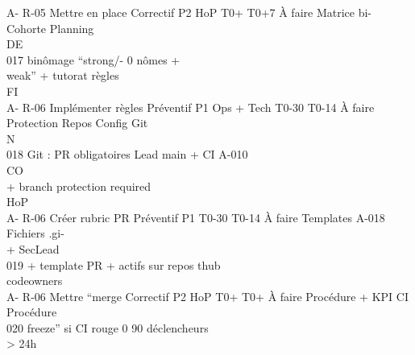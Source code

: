 A- R-05    Mettre en place       Correctif P2    HoP          T0+ T0+7 À faire      Matrice bi-    Cohorte     Planning\\
\vspace{0.5em}
\vspace{0.5em}
\vspace{0.5em}
\vspace{0.5em}
DE\\
017        binômage “strong/-                                 0                     nômes +\\
weak” + tutorat                                                          règles\\
\vspace{0.5em}
\vspace{0.5em}
\vspace{0.5em}
\vspace{0.5em}
FI\\
A- R-06    Implémenter règles Préventif P1       Ops + Tech   T0-30 T0-14 À faire   Protection     Repos       Config Git\\
\vspace{0.5em}
\vspace{0.5em}
\vspace{0.5em}
\vspace{0.5em}
N\\
018        Git : PR obligatoires                 Lead                               main + CI      A-010\\
\vspace{0.5em}
\vspace{0.5em}
CO\\
+ branch protection                                                      required\\
HoP\\
A- R-06    Créer rubric PR       Préventif P1                 T0-30 T0-14 À faire   Templates        A-018     Fichiers .gi-\\
+ SecLead\\
019        + template PR +                                                          actifs sur repos           thub\\
codeowners\\
A- R-06    Mettre “merge         Correctif P2    HoP          T0+ T0+     À faire   Procédure +     KPI CI     Procédure\\
020        freeze” si CI rouge                                0   90                déclencheurs\\
\textgreater{} 24h\\

